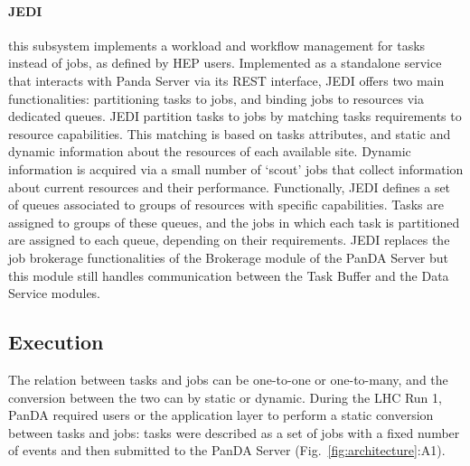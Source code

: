 \paragraph{\textbf{JEDI}} this subsystem implements a workload and workflow
management for tasks instead of jobs, as defined by HEP users. Implemented as a
standalone service that interacts with Panda Server via its REST interface, JEDI
offers two main functionalities: partitioning tasks to jobs, and binding jobs to
resources via dedicated queues. JEDI partition tasks to jobs by matching tasks
requirements to resource capabilities. This matching is based on tasks
attributes, and static and dynamic information about the resources of each
available site. Dynamic information is acquired via a small number of `scout'
jobs that collect information about current resources and their performance.
Functionally, JEDI defines a set of queues associated to groups of resources
with specific capabilities. Tasks are assigned to groups of these queues, and
the jobs in which each task is partitioned are assigned to each queue, depending
on their requirements. JEDI replaces the job brokerage functionalities of the
Brokerage module of the PanDA Server but this module still handles communication
between the Task Buffer and the Data Service modules.


\subsection{Execution}
\label{ssec:panda_exec}


The relation between tasks and jobs can be one-to-one or one-to-many, and the
conversion between the two can by static or dynamic. During the LHC Run 1, PanDA
required users or the application layer to perform a static conversion between
tasks and jobs: tasks were described as a set of jobs with a fixed number of
events and then submitted to the PanDA Server (Fig.~\ref{fig:architecture}:A1).

